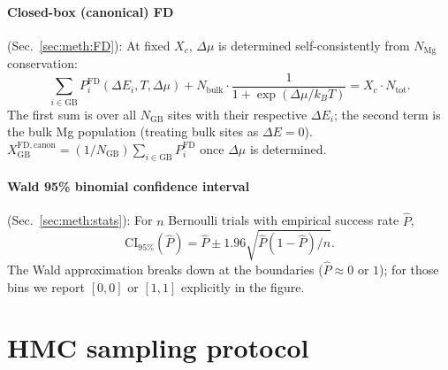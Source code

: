 \paragraph*{Closed-box (canonical) FD}
(Sec.~\ref{sec:meth:FD}):
At fixed $X_c$, $\Delta\mu$ is determined self-consistently from
$N_\mathrm{Mg}$ conservation:
\begin{equation}\label{eq:FD_canon}
\sum_{i \in \mathrm{GB}} P_i^\mathrm{FD}(\Delta E_i, T, \Delta\mu)
+ N_\mathrm{bulk} \cdot
\frac{1}{1 + \exp(\Delta\mu/k_B T)}
= X_c \cdot N_\mathrm{tot}.
\end{equation}
The first sum is over all $N_\mathrm{GB}$ sites with their respective
$\Delta E_i$; the second term is the bulk Mg population (treating bulk
sites as $\Delta E = 0$). $X_\mathrm{GB}^\mathrm{FD,canon} =
(1/N_\mathrm{GB}) \sum_{i \in \mathrm{GB}} P_i^\mathrm{FD}$ once
$\Delta\mu$ is determined.

\paragraph*{Wald 95\% binomial confidence interval}
(Sec.~\ref{sec:meth:stats}):
For $n$ Bernoulli trials with empirical success rate $\hat P$,
\begin{equation}\label{eq:WaldCI}
\mathrm{CI}_{95\%}(\hat P) =
\hat P \pm 1.96 \sqrt{\hat P (1-\hat P) / n}.
\end{equation}
The Wald approximation breaks down at the boundaries
($\hat P \approx 0$ or $1$); for those bins we report $[0, 0]$ or
$[1, 1]$ explicitly in the figure.


\section{HMC sampling protocol}\label{app:alg}

